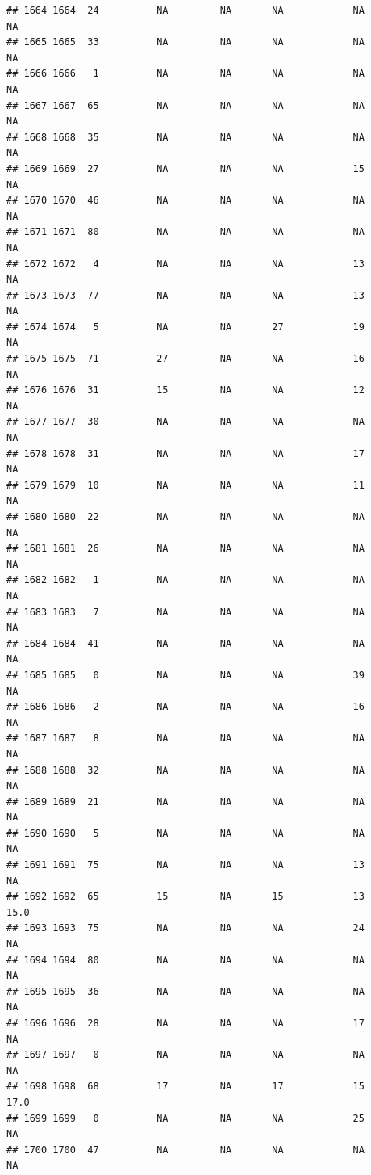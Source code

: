 \documentclass[man]{apa6}
\begin{document}
\begin{verbatim}
## 1664 1664  24          NA         NA       NA            NA       NA
## 1665 1665  33          NA         NA       NA            NA       NA
## 1666 1666   1          NA         NA       NA            NA       NA
## 1667 1667  65          NA         NA       NA            NA       NA
## 1668 1668  35          NA         NA       NA            NA       NA
## 1669 1669  27          NA         NA       NA            15       NA
## 1670 1670  46          NA         NA       NA            NA       NA
## 1671 1671  80          NA         NA       NA            NA       NA
## 1672 1672   4          NA         NA       NA            13       NA
## 1673 1673  77          NA         NA       NA            13       NA
## 1674 1674   5          NA         NA       27            19       NA
## 1675 1675  71          27         NA       NA            16       NA
## 1676 1676  31          15         NA       NA            12       NA
## 1677 1677  30          NA         NA       NA            NA       NA
## 1678 1678  31          NA         NA       NA            17       NA
## 1679 1679  10          NA         NA       NA            11       NA
## 1680 1680  22          NA         NA       NA            NA       NA
## 1681 1681  26          NA         NA       NA            NA       NA
## 1682 1682   1          NA         NA       NA            NA       NA
## 1683 1683   7          NA         NA       NA            NA       NA
## 1684 1684  41          NA         NA       NA            NA       NA
## 1685 1685   0          NA         NA       NA            39       NA
## 1686 1686   2          NA         NA       NA            16       NA
## 1687 1687   8          NA         NA       NA            NA       NA
## 1688 1688  32          NA         NA       NA            NA       NA
## 1689 1689  21          NA         NA       NA            NA       NA
## 1690 1690   5          NA         NA       NA            NA       NA
## 1691 1691  75          NA         NA       NA            13       NA
## 1692 1692  65          15         NA       15            13     15.0
## 1693 1693  75          NA         NA       NA            24       NA
## 1694 1694  80          NA         NA       NA            NA       NA
## 1695 1695  36          NA         NA       NA            NA       NA
## 1696 1696  28          NA         NA       NA            17       NA
## 1697 1697   0          NA         NA       NA            NA       NA
## 1698 1698  68          17         NA       17            15     17.0
## 1699 1699   0          NA         NA       NA            25       NA
## 1700 1700  47          NA         NA       NA            NA       NA

\end{verbatim}
\end{document}
